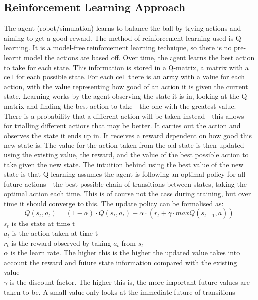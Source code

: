 \documentclass[12pt,a4paper]{article}
\begin{document}
\subsection{Reinforcement Learning Approach}
The agent (robot/simulation) learns to balance the ball by trying actions and aiming to get a good reward. The method of reinforcement learning used is Q-learning. It is a model-free reinforcement learning technique, so there is no pre-learnt model the actions are based off. Over time, the agent learns the best action to take for each state. This information is stored in a Q-matrix, a matrix with a cell for each possible state. For each cell there is an array with a value for each action, with the value representing how good of an action it is given the current state. Learning works by the agent observing the state it is in, looking at the Q-matrix and finding the best action to take - the one with the greatest value. There is a probability that a different action will be taken instead - this allows for trialling different actions that may be better. It carries out the action and observes the state it ends up in. It receives a reward dependent on how good this new state is. The value for the action taken from the old state is then updated using the existing value, the reward, and the value of the best possible action to take given the new state. The intuition behind using the best value of the new state is that Q-learning assumes the agent is following an optimal policy for all future actions - the best possible chain of transitions between states, taking the optimal action each time. This is of course not the case during training, but over time it should converge to this. The update policy can be formalised as:
\[Q(s_t, a_t) = (1 - \alpha) \cdot Q(s_t, a_t) + \alpha\cdot(r_t + \gamma\cdot max Q(s_{t+1}, a)) \]
$s_t$ is the state at time t \\
$a_t$ is the action taken at time t \\
$r_t$ is the reward observed by taking $a_t$ from $s_t$\\
$\alpha$ is the learn rate. The higher this is the higher the updated value takes into account the reward and future state information compared with the existing value\\
$\gamma$ is the discount factor. The higher this is, the more important future values are taken to be. A small value only looks at the immediate future of transitions\\
\end{document}
